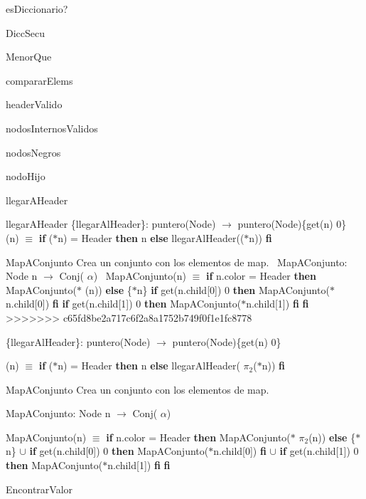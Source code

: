 \begin{DoxyParagraph}{es\-Diccionario?}
\begin{DoxyParagraph}{\-Dicc\-Secu}
\begin{DoxyParagraph}{\-Menor\-Que}
\begin{DoxyParagraph}{comparar\-Elems}
\begin{DoxyParagraph}{header\-Valido}
\begin{DoxyParagraph}{nodos\-Internos\-Validos}
\begin{DoxyParagraph}{nodos\-Negros}
\begin{DoxyParagraph}{nodo\-Hijo}
\begin{DoxyParagraph}{llegar\-A\-Header}
\begin{DoxyParagraph}{llegar\+A\+Header}
\{llegar\+Al\+Header\}\+: puntero(\+Node) $\to$ puntero(\+Node)\{get(n)  0\}~\newline
(n) $\equiv$ {\bfseries if} ($\ast$n) = Header {\bfseries then} n {\bfseries else} llegar\+Al\+Header(($\ast$n)) {\bfseries fi} 


\end{DoxyParagraph}
\begin{DoxyParagraph}{Map\+A\+Conjunto}
Crea un conjunto con los elementos de map.~\newline
 Map\+A\+Conjunto\+: Node n $\to$ Conj( $\alpha$)~\newline
Map\+A\+Conjunto(n) $\equiv$ {\bfseries if} n.\+color = Header {\bfseries then} Map\+A\+Conjunto($\ast$ (n)) {\bfseries else} \{$\ast$n\}  {\bfseries if} get(n.\+child\mbox{[}0\mbox{]})  0 {\bfseries then} Map\+A\+Conjunto($\ast$n.child\mbox{[}0\mbox{]}) {\bfseries fi}  {\bfseries if} get(n.\+child\mbox{[}1\mbox{]})  0 {\bfseries then} Map\+A\+Conjunto($\ast$n.child\mbox{[}1\mbox{]}) {\bfseries fi} {\bfseries fi} 
>>>>>>> c65fd8be2a717c6f2a8a1752b749f0f1e1fc8778
\end{DoxyParagraph}
\{llegar\-Al\-Header\}\-: puntero(\-Node) $\to$ puntero(\-Node)\{get(n)  0\}\par
 (n) $\equiv$ {\bfseries if} ($\ast$n) = \-Header {\bfseries then} n {\bfseries else} llegar\-Al\-Header( $\pi_2$($\ast$n)) {\bfseries fi} 

\begin{DoxyParagraph}{\-Map\-A\-Conjunto}
\-Crea un conjunto con los elementos de map.\par

\end{DoxyParagraph}
\-Map\-A\-Conjunto\-: \-Node n $\to$ \-Conj( $\alpha$)\par
 \-Map\-A\-Conjunto(n) $\equiv$ {\bfseries if} n.\-color = \-Header {\bfseries then} \-Map\-A\-Conjunto($\ast$ $\pi_2$(n)) {\bfseries else} \{$\ast$n\} $\cup$ {\bfseries if} get(n.\-child\mbox{[}0\mbox{]})  0 {\bfseries then} \-Map\-A\-Conjunto($\ast$n.child\mbox{[}0\mbox{]}) {\bfseries fi} $\cup$ {\bfseries if} get(n.\-child\mbox{[}1\mbox{]})  0 {\bfseries then} \-Map\-A\-Conjunto($\ast$n.child\mbox{[}1\mbox{]}) {\bfseries fi} {\bfseries fi} 

\begin{DoxyParagraph}{\-Encontrar\-Valor}


\end{DoxyParagraph}
\end{DoxyParagraph}
\end{DoxyParagraph}
\end{DoxyParagraph}
\end{DoxyParagraph}
\end{DoxyParagraph}
\end{DoxyParagraph}
\end{DoxyParagraph}
\end{DoxyParagraph}
\end{DoxyParagraph}
